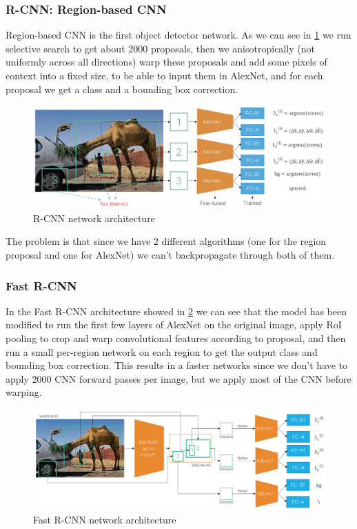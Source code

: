 \documentclass{article}
\begin{document}
\subsubsection{R-CNN: Region-based CNN}

Region-based CNN is the first object detector network.
As we can see in \ref{fig:rcnn} we run selective search to get about 2000 proposals, then we anisotropically (not uniformly across all directions) warp these proposals and add some pixels of context into a fixed size, to be able to input them in AlexNet, and for each proposal we get a class and a bounding box correction.

\begin{figure}[htbp]
  \centering
  \includegraphics[width=0.6\linewidth]{./img/rcnn.jpg}
  \caption{R-CNN network architecture}
  \label{fig:rcnn}
\end{figure}

The problem is that since we have 2 different algorithms (one for the region proposal and one for AlexNet) we can't backpropagate through both of them.

\subsubsection{Fast R-CNN}

In the Fast R-CNN architecture showed in \ref{fig:fastrcnn} we can see that the model has been modified to run the first few layers of AlexNet on the original image, apply RoI pooling to crop and warp convolutional features according to proposal, and then run a small per-region network on each region to get the output class and bounding box correction.
This results in a faster networks since we don't have to apply 2000 CNN forward passes per image, but we apply most of the CNN before warping.

\begin{figure}[htbp]
  \centering
  \includegraphics[width=0.6\linewidth]{./img/fastrcnn.png}
  \caption{Fast R-CNN network architecture}
  \label{fig:fastrcnn}
\end{figure}
\end{document}

